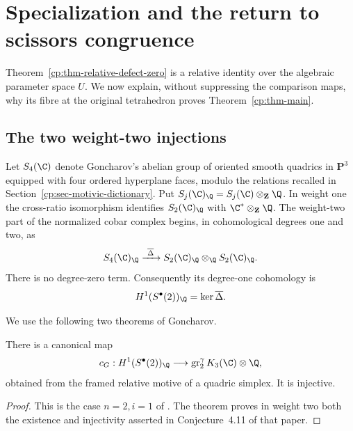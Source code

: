 \section{Specialization and the return to scissors congruence}
\label{cp:sec-specialization}

Theorem~\ref{cp:thm-relative-defect-zero} is a relative identity over the
algebraic parameter space \(U\).  We now explain, without suppressing the
comparison maps, why its fibre at the original tetrahedron proves
Theorem~\ref{cp:thm-main}.

\subsection{The two weight-two injections}

Let \(S_4(\C)\) denote Goncharov's abelian group of oriented smooth
quadrics in \(\mathbf P^3\) equipped with four ordered hyperplane faces,
modulo the relations recalled in Section~\ref{cp:sec-motivic-dictionary}.
Put \(S_j(\C)_\Q=S_j(\C)\otimes_{\mathbf Z}\Q\).  In weight one the
cross-ratio isomorphism identifies
\(S_2(\C)_\Q\) with \(\C^*\otimes_{\mathbf Z}\Q\).  The weight-two part of
the normalized cobar complex begins, in cohomological degrees one and two,
as
\[
 S_4(\C)_\Q\xrightarrow{\ \overline\Delta\ }
 S_2(\C)_\Q\otimes_\Q S_2(\C)_\Q.
\]
There is no degree-zero term.  Consequently its degree-one cohomology is
\begin{equation}
 H^1(S^\bullet(2))_\Q=\ker\overline\Delta.
 \label{cp:eq-primitive-quadric-group}
\end{equation}

We use the following two theorems of Goncharov.

\begin{theorem}
\label{cp:thm-goncharov-weight-two}
There is a canonical map
\begin{equation}
 c_G:H^1(S^\bullet(2))_\Q
 \longrightarrow \gr_2^\gamma K_3(\C)\otimes\Q,
 \label{cp:eq-goncharov-k3-map}
\end{equation}
obtained from the framed relative motive of a quadric simplex.  It is
injective.
\end{theorem}

\begin{proof}
This is the case \(n=2,i=1\) of
\cite[Theorem~4.13, equation~(4.7)]{Goncharov1999}.  The theorem proves in
weight two both the existence and injectivity asserted in Conjecture~4.11
of that paper.
\end{proof}

